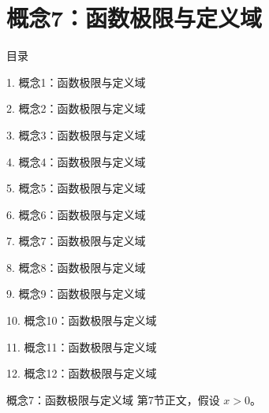 \documentclass[aspectratio=169,10pt,fontset=fandol]{ctexbeamer}
\begin{document}
\section{概念7：函数极限与定义域}
\begin{frame}[t,fragile]{目录}
\small
{\color{black}\small 1. 概念1：函数极限与定义域\par}\vspace{0.22em}
{\color{black}\small 2. 概念2：函数极限与定义域\par}\vspace{0.22em}
{\color{black}\small 3. 概念3：函数极限与定义域\par}\vspace{0.22em}
{\color{black}\small 4. 概念4：函数极限与定义域\par}\vspace{0.22em}
{\color{black}\small 5. 概念5：函数极限与定义域\par}\vspace{0.22em}
{\color{black}\small 6. 概念6：函数极限与定义域\par}\vspace{0.22em}
{\color{blue}\small 7. 概念7：函数极限与定义域\par}\vspace{0.22em}
{\color{gray!40}\small 8. 概念8：函数极限与定义域\par}\vspace{0.22em}
{\color{gray!40}\small 9. 概念9：函数极限与定义域\par}\vspace{0.22em}
{\color{gray!40}\small 10. 概念10：函数极限与定义域\par}\vspace{0.22em}
{\color{gray!40}\small 11. 概念11：函数极限与定义域\par}\vspace{0.22em}
{\color{gray!40}\small 12. 概念12：函数极限与定义域\par}\vspace{0.22em}
\end{frame}
\begin{frame}[t,fragile]{概念7：函数极限与定义域}
\normalsize
{\normalsize
第7节正文，假设 $x>0$。
}
\end{frame}
\end{document}
